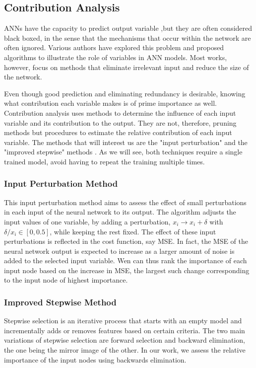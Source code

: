\documentclass{article}
\begin{document}
\subsection{Contribution Analysis}

ANNs have the capacity to predict output variable ,but they are often considered black boxed, in the sense that the mechanisms that occur within the network are often ignored. Various authors have explored this problem and proposed algorithms to illustrate the role of variables in ANN models. Most works, however, focus on methods that eliminate irrelevant input and reduce the size of the network. 

Even though good prediction and eliminating redundancy is desirable, knowing what contribution each variable makes is of prime importance as well. Contribution analysis uses methods to determine the influence of each input variable and its contribution to the output. They are not, therefore, pruning methods but procedures to estimate the relative contribution of each input variable. The methods that will interest us are the "input perturbation" and the "improved stepwise" methods \cite{contranal}. As we will see, both techniques require a single trained model, avoid having to repeat the training multiple times.

\subsubsection{Input Perturbation Method}

This input perturbation method aims to assess the effect of small perturbations in each input of the neural network to its output. The algorithm adjusts the input values of one variable, by adding a perturbation, $x_i\rightarrow x_i + \delta$ with $\delta/x_i\in[0,0.5]$, while keeping the rest fixed. The effect of these input perturbations is reflected in the cost function, say MSE. In fact, the MSE of the neural network output is expected to increase as a larger amount of noise is added to the selected input variable. Wen can thus rank the importance of each input node based on the increase in MSE, the largest such change corresponding to the input node of highest importance.

\subsubsection{Improved Stepwise Method}

Stepwise selection is an iterative process that starts with an empty model and incrementally adds or removes features based on certain criteria. The two main variations of stepwise selection are forward selection and backward elimination, the one being the mirror image of the other. In our work, we assess the relative importance of the input nodes using backwards elimination. 
\end{document}
